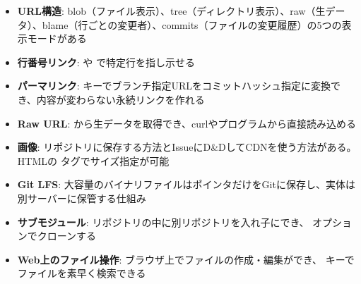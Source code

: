 \begin{itemize}
  \item \textbf{URL構造}: blob（ファイル表示）、tree（ディレクトリ表示）、raw（生データ）、blame（行ごとの変更者）、commits（ファイルの変更履歴）の5つの表示モードがある
  \item \textbf{行番号リンク}:  や  で特定行を指し示せる
  \item \textbf{パーマリンク}:  キーでブランチ指定URLをコミットハッシュ指定に変換でき、内容が変わらない永続リンクを作れる
  \item \textbf{Raw URL}:  から生データを取得でき、curlやプログラムから直接読み込める
  \item \textbf{画像}: リポジトリに保存する方法とIssueにD\&DしてCDNを使う方法がある。HTMLの  タグでサイズ指定が可能
  \item \textbf{Git LFS}: 大容量のバイナリファイルはポインタだけをGitに保存し、実体は別サーバーに保管する仕組み
  \item \textbf{サブモジュール}: リポジトリの中に別リポジトリを入れ子にでき、 オプションでクローンする
  \item \textbf{Web上のファイル操作}: ブラウザ上でファイルの作成・編集ができ、 キーでファイルを素早く検索できる
\end{itemize}
